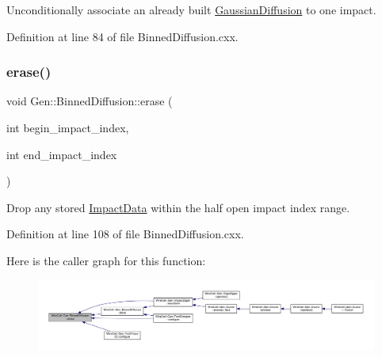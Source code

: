 Unconditionally associate an already built \hyperlink{class_wire_cell_1_1_gen_1_1_gaussian_diffusion}{Gaussian\+Diffusion} to one impact. 

Definition at line 84 of file Binned\+Diffusion.\+cxx.

\mbox{\label{class_wire_cell_1_1_gen_1_1_binned_diffusion_a1b261eff7e9581f22bd83d1ea40077ed}} 
\subsubsection{\texorpdfstring{erase()}{erase()}}
{\footnotesize\ttfamily void Gen\+::\+Binned\+Diffusion\+::erase (\begin{DoxyParamCaption}\item[{int}]{begin\+\_\+impact\+\_\+index,  }\item[{int}]{end\+\_\+impact\+\_\+index }\end{DoxyParamCaption})}

Drop any stored \hyperlink{class_wire_cell_1_1_gen_1_1_impact_data}{Impact\+Data} within the half open impact index range. 

Definition at line 108 of file Binned\+Diffusion.\+cxx.

Here is the caller graph for this function\+:
\nopagebreak
\begin{figure}[H]
\begin{center}
\leavevmode
\includegraphics[width=350pt]{class_wire_cell_1_1_gen_1_1_binned_diffusion_a1b261eff7e9581f22bd83d1ea40077ed_icgraph}
\end{center}
\end{figure}
\mbox{\label{class_wire_cell_1_1_gen_1_1_binned_diffusion_a06cf95c6488368e1ed0a88fb27309f37}} 
